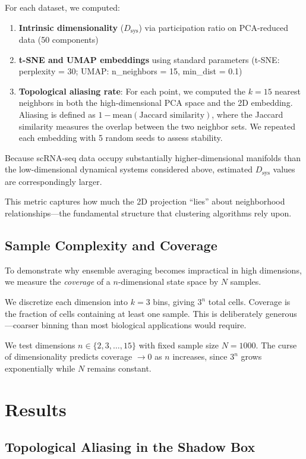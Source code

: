 \documentclass[12pt]{article}
\begin{document}
For each dataset, we computed:
\begin{enumerate}
    \item \textbf{Intrinsic dimensionality} ($D_{\text{sys}}$) via participation ratio on PCA-reduced data (50 components)
    \item \textbf{t-SNE and UMAP embeddings} using standard parameters (t-SNE: perplexity = 30; UMAP: n\_neighbors = 15, min\_dist = 0.1)
    \item \textbf{Topological aliasing rate}: For each point, we computed the $k = 15$ nearest neighbors in both the high-dimensional PCA space and the 2D embedding. Aliasing is defined as $1 - \text{mean}(\text{Jaccard similarity})$, where the Jaccard similarity measures the overlap between the two neighbor sets. We repeated each embedding with 5 random seeds to assess stability.
\end{enumerate}

Because scRNA-seq data occupy substantially higher-dimensional manifolds than the low-dimensional dynamical systems considered above, estimated $D_{\text{sys}}$ values are correspondingly larger.

This metric captures how much the 2D projection ``lies'' about neighborhood relationships---the fundamental structure that clustering algorithms rely upon.

\subsection{Sample Complexity and Coverage}

To demonstrate why ensemble averaging becomes impractical in high dimensions, we measure the \emph{coverage} of a $n$-dimensional state space by $N$ samples.

We discretize each dimension into $k = 3$ bins, giving $3^n$ total cells. Coverage is the fraction of cells containing at least one sample. This is deliberately generous---coarser binning than most biological applications would require.

We test dimensions $n \in \{2, 3, \ldots, 15\}$ with fixed sample size $N = 1000$. The curse of dimensionality predicts coverage $\to 0$ as $n$ increases, since $3^n$ grows exponentially while $N$ remains constant.

\section{Results}

\subsection{Topological Aliasing in the Shadow Box}
\end{document}
